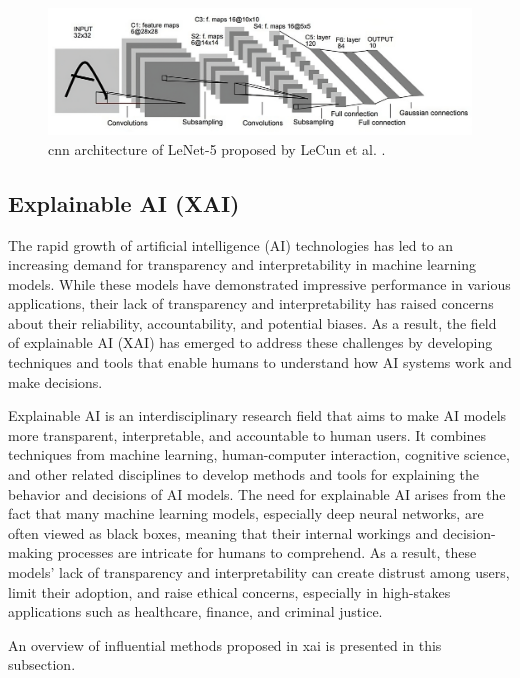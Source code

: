 \begin{figure}[htb]
    \centerline{
    \includegraphics[width=1.2\linewidth]{images/LeNet.jpeg}}
    \caption{\gls{cnn} architecture of LeNet-5 proposed by LeCun et al. \cite{lecunGradientbasedLearningApplied1998}.}
    \label{fig:lenet}
\end{figure} 

\subsection{Explainable AI (XAI)}

The rapid growth of artificial intelligence (AI) technologies has led to an increasing demand for transparency and interpretability in machine learning models. While these models have demonstrated impressive performance in various applications, their lack of transparency and interpretability has raised concerns about their reliability, accountability, and potential biases. As a result, the field of explainable AI (XAI) has emerged to address these challenges by developing techniques and tools that enable humans to understand how AI systems work and make decisions.

Explainable AI is an interdisciplinary research field that aims to make AI models more transparent, interpretable, and accountable to human users. It combines techniques from machine learning, human-computer interaction, cognitive science, and other related disciplines to develop methods and tools for explaining the behavior and decisions of AI models. The need for explainable AI arises from the fact that many machine learning models, especially deep neural networks, are often viewed as black boxes, meaning that their internal workings and decision-making processes are intricate for humans to comprehend. As a result, these models' lack of transparency and interpretability can create distrust among users, limit their adoption, and raise ethical concerns, especially in high-stakes applications such as healthcare, finance, and criminal justice.

An overview of influential methods proposed in \gls{xai} is presented in this subsection.

